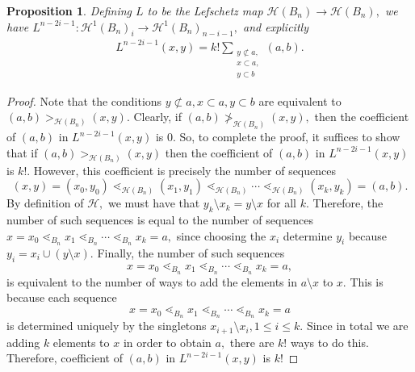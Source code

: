 \documentclass[10 pt]{amsart}
\theoremstyle{plain}
\newtheorem{prop}[thm]{Proposition}
\theoremstyle{definition}
\theoremstyle{remark}
\numberwithin{equation}{section}
\newcommand\fbn{\mathcal H}
\begin{document}
\begin{prop}
\label{prop:explicit_gbn_lefchetz}
Defining $L$ to be the Lefschetz map $\mathcal H(B_n) \rightarrow \mathcal H(B_n),$ we have $L^{n-2i-1}:\fbn^1(B_n)_i \rightarrow \fbn^1(B_n)_{n-i-1},$ and explicitly 
\begin{align*}
	L^{n-2i-1}(x, y)= k!\sum_{\substack{{y \not \subset a,}\\{x\subset a,}\\{y \subset b}}}^{}(a, b).
\end{align*}
\end{prop}
\begin{proof}
Note that the conditions $y \not \subset a, x\subset a, y\subset b$ are equivalent to $(a, b) >_{ \mathcal H(B_n)} (x, y).$ Clearly, if $(a, b) \not >_{ \mathcal H(B_n)} (x, y),$ then the coefficient of $(a, b)$ in $	L^{n-2i-1}(x, y)$ is 0. So, to complete the proof, it suffices to show that if  $(a, b) >_{ \mathcal H(B_n)} (x, y)$ then the coefficient of $(a, b)$ in $	L^{n-2i-1}(x, y)$ is $k!$. However, this coefficient is precisely the number of sequences 
$$(x, y) = (x_0, y_0) \lessdot_{ \mathcal H(B_n)} (x_1, y_1) \lessdot_{ \mathcal H(B_n)}  \cdots \lessdot_{ \mathcal H(B_n)}  (x_k, y_k) = (a, b).$$
By definition of $ \mathcal H,$ we must have that $y_k \setminus x_k = y\setminus x$ for all $k.$ Therefore, the number of such sequences is equal to the number of sequences $x=x_0 \lessdot_{B_n} x_1 \lessdot_{B_n} \cdots \lessdot_{B_n} x_k = a,$ since choosing the $x_i$ determine $y_i$ because $y_i = x_i \cup (y \setminus x).$ Finally, the number of such sequences  
$$x=x_0 \lessdot_{B_n} x_1 \lessdot_{B_n} \cdots \lessdot_{B_n} x_k = a,$$
is equivalent to the number of ways to add the elements in $a \setminus x$ to $x$. This is because each sequence 
$$x=x_0 \lessdot_{B_n} x_1 \lessdot_{B_n} \cdots \lessdot_{B_n} x_k = a$$
is determined uniquely by the singletons $x_{i+1} \setminus x_i, 1 \leq i \leq k.$ Since in total we are adding $k$ elements to $x$ in order to obtain $a,$ there are $k!$ ways to do this. Therefore, coefficient of $(a, b)$ in $	L^{n-2i-1}(x, y)$ is $k!$
\end{proof}
\end{document}

